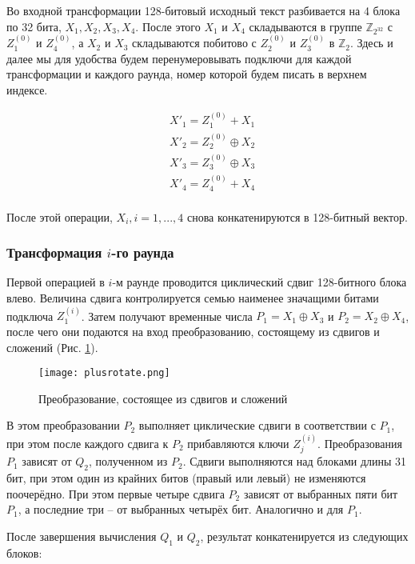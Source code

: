 \documentclass[12pt, a4paper]{article}
\begin{document}
Во входной трансформации 128-битовый исходный текст разбивается на 4 блока по 32 бита, $X_1, X_2, X_3, X_4$. 
После этого $X_1$ и $X_4$ складываются в группе $\mathds{Z}_{2^{32}}$ с $Z_1^{(0)}$ и $Z_4^{(0)}$, а $X_2$ и $X_3$ складываются побитово с $Z_2^{(0)}$ и $Z_3^{(0)}$ в $\mathds{Z}_2$. Здесь и далее мы для удобства будем перенумеровывать подключи для каждой трансформации и каждого раунда, номер которой будем писать в верхнем индексе. 

\begin{equation}
\begin{split}
& X'_1 = Z_1^{(0)} + X_1 \\
& X'_2 = Z_2^{(0)} \oplus X_2 \\
& X'_3 = Z_3^{(0)} \oplus X_3 \\
& X'_4 = Z_4^{(0)} + X_4 \\
\end{split}
\end{equation}

После этой операции, $X_i, i = 1, ..., 4$ снова конкатенируются в 128-битный вектор.

\subsubsection{Трансформация $i$-го раунда}

Первой операцией в $i$-м раунде проводится циклический сдвиг 128-битного блока влево. Величина сдвига контролируется семью наименее значащими битами подключа $Z_1^{(i)}$. Затем получают временные числа $P_1 = X_1 \oplus X_3$ и $P_2 = X_2 \oplus X_4$, после чего они подаются на вход преобразованию, состоящему из сдвигов и сложений (Рис. \ref{pic:1}).

\begin{figure}[h] 
\texttt{[image: plusrotate.png]}
\caption{Преобразование, состоящее из сдвигов и сложений}
\label{pic:1}
\end{figure}

В этом преобразовании $P_2$ выполняет циклические сдвиги в соответствии с $P_1$, при этом после каждого сдвига к $P_2$ прибавляются ключи $Z_j^{(i)}$. Преобразования $P_1$ зависят от $Q_2$, полученном из $P_2$. Сдвиги выполняются над блоками длины 31 бит, при этом один из крайних битов (правый или левый) не изменяются поочерёдно. При этом первые четыре сдвига $P_2$ зависят от выбранных пяти бит $P_1$, а последние три -- от выбранных четырёх бит. Аналогично и для $P_1$.

После завершения вычисления $Q_1$ и $Q_2$, результат конкатенируется из следующих блоков:
\end{document}
